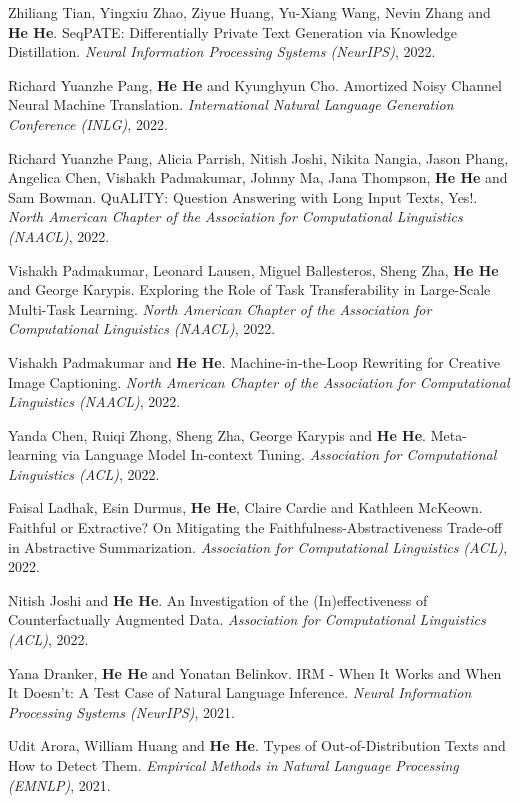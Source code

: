 Zhiliang Tian, Yingxiu Zhao, Ziyue Huang, Yu-Xiang Wang, Nevin Zhang and \textbf{He He}. SeqPATE: Differentially Private Text Generation via Knowledge Distillation. \textit{Neural Information Processing Systems (NeurIPS)}, 2022.

Richard Yuanzhe Pang, \textbf{He He} and Kyunghyun Cho. Amortized Noisy Channel Neural Machine Translation. \textit{International Natural Language Generation Conference (INLG)}, 2022.

Richard Yuanzhe Pang, Alicia Parrish, Nitish Joshi, Nikita Nangia, Jason Phang, Angelica Chen, Vishakh Padmakumar, Johnny Ma, Jana Thompson, \textbf{He He} and Sam Bowman. {QuALITY}: Question Answering with Long Input Texts, Yes!. \textit{North American Chapter of the Association for Computational Linguistics (NAACL)}, 2022.

Vishakh Padmakumar, Leonard Lausen, Miguel Ballesteros, Sheng Zha, \textbf{He He} and George Karypis. Exploring the Role of Task Transferability in Large-Scale Multi-Task Learning. \textit{North American Chapter of the Association for Computational Linguistics (NAACL)}, 2022.

Vishakh Padmakumar and \textbf{He He}. Machine-in-the-Loop Rewriting for Creative Image Captioning. \textit{North American Chapter of the Association for Computational Linguistics (NAACL)}, 2022.

Yanda Chen, Ruiqi Zhong, Sheng Zha, George Karypis and \textbf{He He}. Meta-learning via Language Model In-context Tuning. \textit{Association for Computational Linguistics (ACL)}, 2022.

Faisal Ladhak, Esin Durmus, \textbf{He He}, Claire Cardie and Kathleen McKeown. Faithful or Extractive? On Mitigating the Faithfulness-Abstractiveness Trade-off in Abstractive Summarization. \textit{Association for Computational Linguistics (ACL)}, 2022.

Nitish Joshi and \textbf{He He}. An Investigation of the (In)effectiveness of Counterfactually Augmented Data. \textit{Association for Computational Linguistics (ACL)}, 2022.

Yana Dranker, \textbf{He He} and Yonatan Belinkov. {IRM} - When It Works and When It Doesn't: A Test Case of Natural Language Inference. \textit{Neural Information Processing Systems (NeurIPS)}, 2021.

Udit Arora, William Huang and \textbf{He He}. Types of Out-of-Distribution Texts and How to Detect Them. \textit{Empirical Methods in Natural Language Processing (EMNLP)}, 2021.

